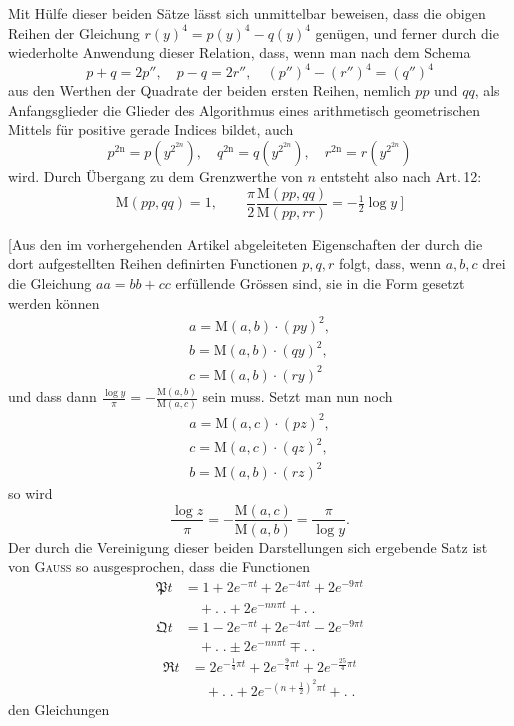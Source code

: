 Mit Hülfe dieser beiden Sätze lässt sich unmittelbar beweisen, dass die
obigen Reihen der Gleichung $r(y)^4=p(y)^4-q(y)^4$ genügen, und ferner durch %
die wiederholte Anwendung dieser Relation, dass, wenn man nach dem Schema
\[
p+q=2p'',\quad p-q=2r'',\quad(p'')^4-(r'')^4=(q'')^4
\]
aus den Werthen der Quadrate der beiden ersten Reihen, nemlich $pp$ und $qq$,
als Anfangsglieder die Glieder des Algorithmus eines arithmetisch geometrischen
Mittels für positive gerade Indices bildet, auch
\[
p^{2\mathrm n}=p(y^{2^{2n}}),\quad q^{2\mathrm n}=q(y^{2^{2n}}),\quad r^{2\mathrm n}=r(y^{2^{2n}})
\]
wird. Durch Übergang zu dem Grenzwerthe von $n$ entsteht also nach Art.\,12:
\[
\mathrm M(pp,qq)=1,\qquad
\frac\pi2\frac{\mathrm M(pp,qq)}{\mathrm M(pp,rr)}=-\tfrac12\log y\ ]
\]

[Aus den im vorhergehenden Artikel abgeleiteten Eigenschaften der durch
die dort aufgestellten Reihen definirten Functionen $p,q,r$ folgt, dass, wenn
$a,b,c$ drei die Gleichung $aa=bb+cc$ erfüllende Grössen sind, sie in die Form
gesetzt werden können
\[
\begin{gathered}a=\mathrm M(a,b)\cdot(py)^2,\\[5pt] b=\mathrm M(a,b)\cdot(qy)^2,\\[5pt] c=\mathrm M(a,b)\cdot(ry)^2\end{gathered}
\]
und dass dann $\frac{\log y}{\pi}=-\frac{\mathrm M(a,b)}{\mathrm M(a,c)}$ sein muss. Setzt man nun noch
\[
\begin{gathered}a=\mathrm M(a,c)\cdot(pz)^2,\\[5pt] c=\mathrm M(a,c)\cdot(qz)^2,\\[5pt] b=\mathrm M(a,b)\cdot(rz)^2\end{gathered}
\]
so wird
\[
\frac{\log z}{\pi}=-\frac{\mathrm M(a,c)}{\mathrm M(a,b)}=\frac{\pi}{\log y}.
\]
Der durch die Vereinigung dieser beiden Darstellungen sich ergebende Satz
ist von \textsc{Gauss} so ausgesprochen, dass die Functionen
\[
\begin{aligned}\mathfrak P t&=1+2e^{-\pi t}+2e^{-4\pi t}+2e^{-9\pi t}\\&\quad+.\;.+2e^{-nn\pi t}+.\;.\end{aligned}
\]
\[
\begin{aligned}\mathfrak Q t&=1-2e^{-\pi t}+2e^{-4\pi t}-2e^{-9\pi t}\\&\quad+.\;.\pm2e^{-nn\pi t}\mp.\;.\end{aligned}
\]
\[
\begin{aligned}\mathfrak R t&=2e^{-\frac14\pi t}+2e^{-\frac94\pi t}+2e^{-\frac{25}4\pi t}\\&\quad+.\;.+2e^{-(n+\frac12)^2\pi t}+.\;.\end{aligned}
\]
den Gleichungen
